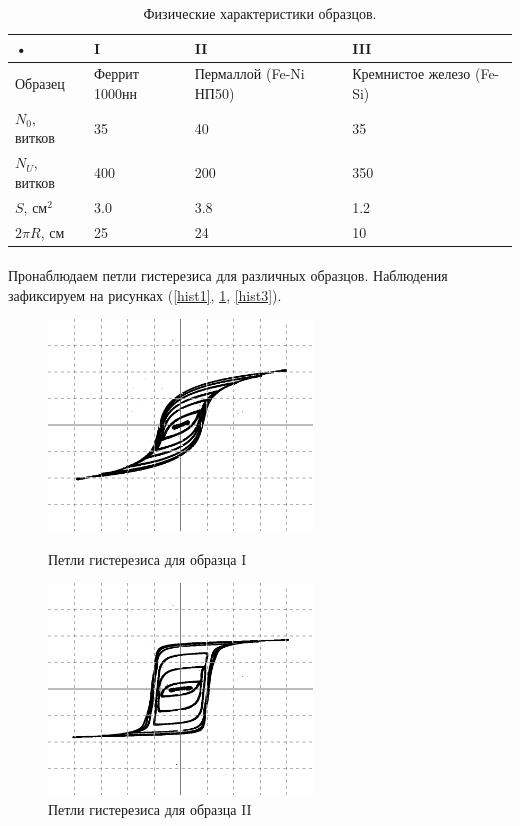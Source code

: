 \documentclass[a4paper,12pt]{article} %
\begin{document}
\begin{table}[h]
\begin{center}
\begin{tabularx}{0.8\textwidth}{|l|X|X|X|}
\hline 
• & I & II & III \\ 
\hline 
Образец & Феррит 1000нн & Пермаллой (Fe-Ni НП50) & Кремнистое железо (Fe-Si) \\ 
\hline 
$N_0$, витков & 35 & 40 & 35 \\ 
\hline 
$N_U$, витков & 400 & 200 & 350 \\ 
\hline 
$S$, см$^2$ & 3.0 & 3.8 & 1.2 \\ 
\hline 
$2 \pi R$, см & 25 & 24 & 10 \\ 
\hline 
\end{tabularx} 
\caption{Физические характеристики образцов.}
\label{physchar}
\end{center}
\end{table}

\paragraph{} Пронаблюдаем петли гистерезиса для различных образцов. Наблюдения зафиксируем на рисунках (\ref{hist1}, \ref{hist2}, \ref{hist3}).

\begin{figure}
\begin{center}
\begin{minipage}[h]{7cm}
\includegraphics[width=7cm]{Hist 1.png}
\caption{Петли гистерезиса для образца I} 
\label{hist1}
\end{minipage}
\hfill
\begin{minipage}[h]{7cm}
\includegraphics[width=7cm]{Hist 2.png}
\caption{Петли гистерезиса для образца II}
\label{hist2}
\end{minipage}
\end{center}
\end{figure}
\end{document}
